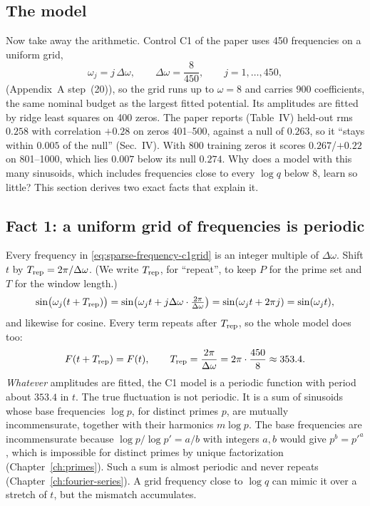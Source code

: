 \subsection{The model}

Now take away the arithmetic. Control C1 of the paper uses 450 frequencies on a uniform grid,
\begin{equation}
\omega_j=j\,\Delta\omega,\qquad \Delta\omega=\frac{8}{450},\qquad j=1,\dots,450,
\label{eq:sparse-frequency-c1grid}
\end{equation}
(Appendix~A step~(20)), so the grid runs up to $\omega=8$ and carries $900$ coefficients, the same nominal budget as the largest fitted potential. Its amplitudes are fitted by ridge least squares on 400 zeros. The paper reports (Table~IV) held-out rms $0.258$ with correlation $+0.28$ on zeros 401--500, against a null of $0.263$, so it ``stays within $0.005$ of the null'' (Sec.~IV). With 800 training zeros it scores $0.267$/$+0.22$ on 801--1000, which lies $0.007$ below its null $0.274$. Why does a model with this many sinusoids, which includes frequencies close to every $\log q$ below 8, learn so little? This section derives two exact facts that explain it.

\subsection{Fact 1: a uniform grid of frequencies is periodic}

Every frequency in \eqref{eq:sparse-frequency-c1grid} is an integer multiple of $\Delta\omega$. Shift $t$ by $T_{\rm rep}=2\pi/\Delta\omega$. (We write $T_{\rm rep}$, for ``repeat'', to keep $P$ for the prime set and $T$ for the window length.)
\begin{equation}
\sin\bigl(\omega_j(t+T_{\rm rep})\bigr)=\sin\bigl(\omega_jt+j\Delta\omega\cdot\tfrac{2\pi}{\Delta\omega}\bigr)=\sin(\omega_jt+2\pi j)=\sin(\omega_jt),
\end{equation}
and likewise for cosine. Every term repeats after $T_{\rm rep}$, so the whole model does too:
\begin{equation}
F(t+T_{\rm rep})=F(t),\qquad T_{\rm rep}=\frac{2\pi}{\Delta\omega}=2\pi\cdot\frac{450}{8}\approx353.4 .
\label{eq:sparse-frequency-period}
\end{equation}
\emph{Whatever} amplitudes are fitted, the C1 model is a periodic function with period about $353.4$ in $t$. The true fluctuation is not periodic. It is a sum of sinusoids whose base frequencies $\log p$, for distinct primes $p$, are mutually incommensurate, together with their harmonics $m\log p$. The base frequencies are incommensurate because $\log p/\log p'=a/b$ with integers $a,b$ would give $p^b=p'^a$, which is impossible for distinct primes by unique factorization (Chapter~\ref{ch:primes}). Such a sum is almost periodic and never repeats (Chapter~\ref{ch:fourier-series}). A grid frequency close to $\log q$ can mimic it over a stretch of $t$, but the mismatch accumulates.

